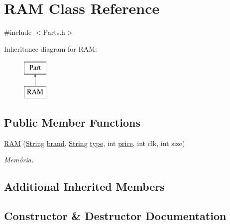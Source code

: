 \hypertarget{class_r_a_m}{}\section{R\+AM Class Reference}
\label{class_r_a_m}


{\ttfamily \#include $<$Parts.\+h$>$}

Inheritance diagram for R\+AM\+:\begin{figure}[H]
\begin{center}
\leavevmode
\includegraphics[height=2.000000cm]{class_r_a_m}
\end{center}
\end{figure}
\subsection*{Public Member Functions}
\begin{DoxyCompactItemize}
\item 
\mbox{\hyperlink{class_r_a_m_a1869d6bd505e7fb58b809270626c82f2}{R\+AM}} (\mbox{\hyperlink{class_string}{String}} \mbox{\hyperlink{class_part_ae06f2fdeb7fbbdb229a7aca151f3e341}{brand}}, \mbox{\hyperlink{class_string}{String}} \mbox{\hyperlink{class_part_a101dbcc5c4b21564df7414c7eb0eae88}{type}}, int \mbox{\hyperlink{class_part_a8e71223aed1da95a974f33d8d6c91bb1}{price}}, int clk, int size)
\begin{DoxyCompactList}\small\item\em Memória. \end{DoxyCompactList}\end{DoxyCompactItemize}
\subsection*{Additional Inherited Members}


\subsection{Constructor \& Destructor Documentation}
\mbox{\label{class_r_a_m_a1869d6bd505e7fb58b809270626c82f2}} 
